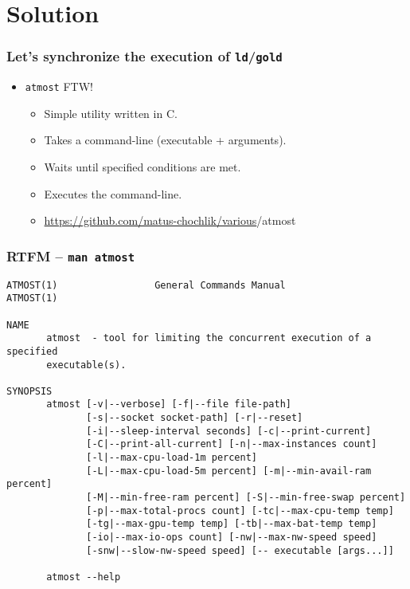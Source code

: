 \documentclass[compress,table,xcolor=table]{beamer}
\newcommand{\shelltext}[1]{\texttt{\colorbox{light-gray}{#1}}}
\begin{document}
\section{Solution}
\begin{frame}
  \frametitle{Let's synchronize the execution of \shelltext{ld}/\shelltext{gold}}
  \begin{itemize}
    \LARGE
    \item \shelltext{atmost} FTW!
    \begin{itemize}
	  \large
      \item Simple utility written in C.
      \item Takes a command-line (executable + arguments).
      \item Waits until specified conditions are met.
	  \item Executes the command-line.
	  \item {\small\url{https://github.com/matus-chochlik/various}/atmost}
	  
    \end{itemize}
  \end{itemize}
\end{frame}
\begin{frame}[fragile]
  \frametitle{RTFM -- \shelltext{man atmost}}
\scriptsize
\begin{verbatim}
ATMOST(1)                 General Commands Manual                ATMOST(1)

NAME
       atmost  - tool for limiting the concurrent execution of a specified
       executable(s).

SYNOPSIS
       atmost [-v|--verbose] [-f|--file file-path]
              [-s|--socket socket-path] [-r|--reset]
              [-i|--sleep-interval seconds] [-c|--print-current]
              [-C|--print-all-current] [-n|--max-instances count]
              [-l|--max-cpu-load-1m percent]
              [-L|--max-cpu-load-5m percent] [-m|--min-avail-ram percent]
              [-M|--min-free-ram percent] [-S|--min-free-swap percent]
              [-p|--max-total-procs count] [-tc|--max-cpu-temp temp]
              [-tg|--max-gpu-temp temp] [-tb|--max-bat-temp temp]
              [-io|--max-io-ops count] [-nw|--max-nw-speed speed]
              [-snw|--slow-nw-speed speed] [-- executable [args...]]

       atmost --help
\end{verbatim}
\end{frame}
\end{document}
